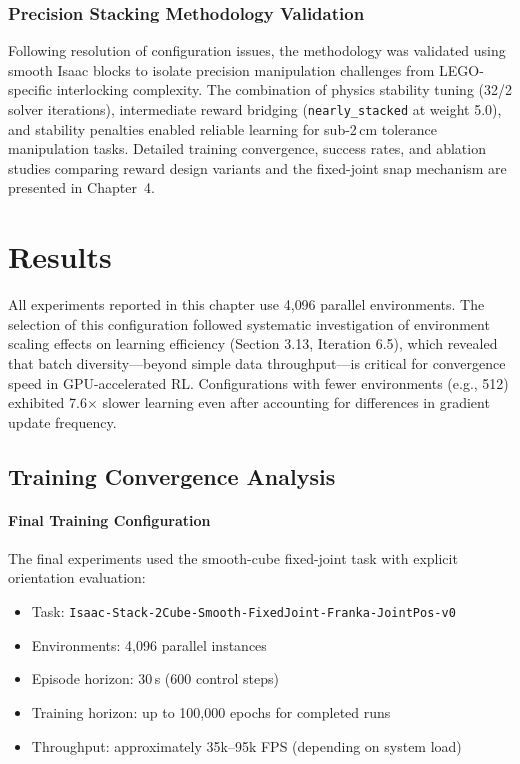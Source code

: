 \documentclass[12pt,a4paper,oneside]{report}
\begin{document}
\subsection{Precision Stacking Methodology Validation}

Following resolution of configuration issues, the methodology was validated using smooth Isaac blocks to isolate precision manipulation challenges from LEGO-specific interlocking complexity. The combination of physics stability tuning (32/2 solver iterations), intermediate reward bridging (\texttt{nearly\_stacked} at weight 5.0), and stability penalties enabled reliable learning for sub-2\,cm tolerance manipulation tasks. Detailed training convergence, success rates, and ablation studies comparing reward design variants and the fixed-joint snap mechanism are presented in Chapter~4.

\chapter{Results}

All experiments reported in this chapter use 4{,}096 parallel environments. The selection of this configuration followed systematic investigation of environment scaling effects on learning efficiency (Section 3.13, Iteration 6.5), which revealed that batch diversity---beyond simple data throughput---is critical for convergence speed in GPU-accelerated RL. Configurations with fewer environments (e.g., 512) exhibited 7.6$\times$ slower learning even after accounting for differences in gradient update frequency.

\section{Training Convergence Analysis}

\subsubsection{Final Training Configuration}

The final experiments used the smooth-cube fixed-joint task with explicit orientation evaluation:

\begin{itemize}
    \item Task: \texttt{Isaac-Stack-2Cube-Smooth-FixedJoint-Franka-JointPos-v0}
    \item Environments: 4{,}096 parallel instances
    \item Episode horizon: 30\,s (600 control steps)
    \item Training horizon: up to 100{,}000 epochs for completed runs
    \item Throughput: approximately 35k--95k FPS (depending on system load)
\end{itemize}
\end{document}
